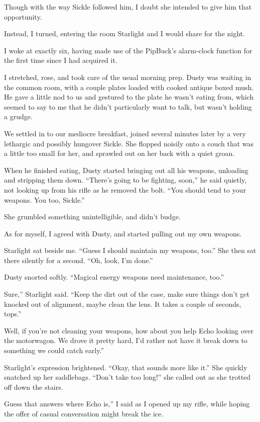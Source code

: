 Though with the way Sickle followed him, I doubt she intended to give him that opportunity.

Instead, I turned, entering the room Starlight and I would share for the night.

{\br}%
I woke at exactly six, having made use of the PipBuck’s alarm-clock function for the first time since I had acquired it.

I stretched, rose, and took care of the usual morning prep. Dusty was waiting in the common room, with a couple plates loaded with cooked antique boxed mush. He gave a little nod to us and gestured to the plate he wasn’t eating from, which seemed to say to me that he didn’t particularly want to talk, but wasn’t holding a grudge.

We settled in to our mediocre breakfast, joined several minutes later by a very lethargic and possibly hungover Sickle. She flopped noisily onto a couch that was a little too small for her, and sprawled out on her back with a quiet groan.

When he finished eating, Dusty started bringing out all his weapons, unloading and stripping them down. “There’s going to be fighting, soon,” he said quietly, not looking up from his rifle as he removed the bolt. “You should tend to your weapons. You too, Sickle.”

She grumbled something unintelligible, and didn’t budge.

As for myself, I agreed with Dusty, and started pulling out my own weapons.

Starlight sat beside me. “Guess I should maintain my weapons, too.” She then sat there silently for a second. “Oh, look, I’m done.”

Dusty snorted softly. “Magical energy weapons need maintenance, too.”

\leavevmode{}Sure,” Starlight said. “Keep the dirt out of the case, make sure things don’t get knocked out of alignment, maybe clean the lens. It takes a couple of seconds, tops.”

\leavevmode{}Well, if you’re not cleaning your weapons, how about you help Echo looking over the motorwagon. We drove it pretty hard, I’d rather not have it break down to something we could catch early.”

Starlight’s expression brightened. “Okay, that sounds more like it.” She quickly snatched up her saddlebags. “Don’t take too long!” she called out as she trotted off down the stairs.

\leavevmode{}Guess that answers where Echo is,” I said as I opened up my rifle, while hoping the offer of casual conversation might break the ice.

